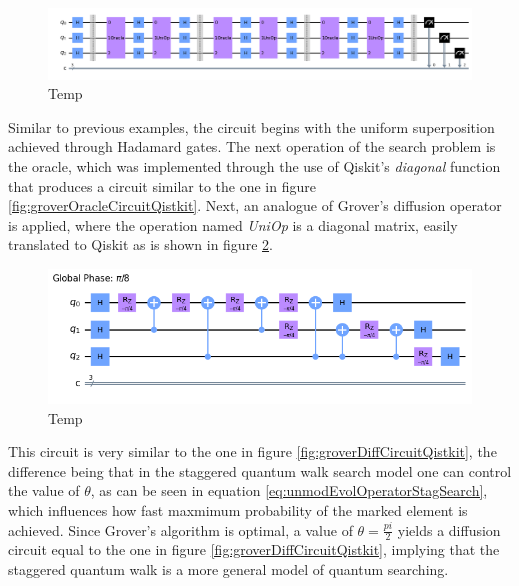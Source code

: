 \documentclass[../../dissertation.tex]{subfiles}
\begin{document}
\begin{figure}[!h]
	\centering
	\includegraphics[scale=0.35]{img/Qiskit/StaggeredQW/Search/Circuits/StagSearchCircuit_N3_M0_S3.png}
	\caption{Temp}
	\label{fig:stagSearchCircQistkit}
\end{figure}
Similar to previous examples, the circuit begins with the uniform superposition
achieved through Hadamard gates. The next operation of the search problem is
the oracle, which was implemented through the use of Qiskit's \textit{diagonal}
function that produces a circuit similar to the one in figure
\ref{fig:groverOracleCircuitQistkit}. Next, an analogue of Grover's diffusion
operator is applied, where the operation named \textit{UniOp} is a diagonal
matrix, easily translated to Qiskit as is shown in figure
\ref{fig:stagSearchUniOpCircQistkit}.  
\begin{figure}[!h]
	\centering
	\includegraphics[scale=0.40]{img/Qiskit/StaggeredQW/Search/Circuits/StagUniOpCircuit_N3_M0_S3.png}
	\caption{Temp}
	\label{fig:stagSearchUniOpCircQistkit}
\end{figure}
This circuit is very similar to the one in figure
\ref{fig:groverDiffCircuitQistkit}, the difference being that in the staggered
quantum walk search model one can control the value of $\theta$, as can be seen
in equation \ref{eq:unmodEvolOperatorStagSearch}, which influences how fast
maxmimum probability of the marked element is achieved. Since Grover's
algorithm is optimal, a value of $\theta=\frac{pi}{2}$ yields a diffusion
circuit equal to the one in figure \ref{fig:groverDiffCircuitQistkit}, implying
that the staggered quantum walk is a more general model of quantum searching. 
\end{document}
